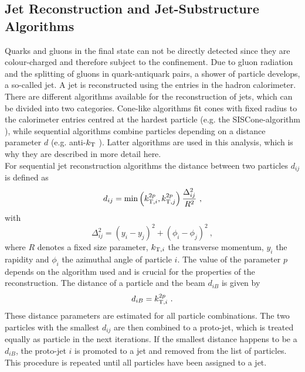 \subsection{Jet Reconstruction and Jet-Substructure Algorithms}
\label{sec:jetreco}
Quarks and gluons in the final state can not be directly detected since they are colour-charged and therefore subject to the confinement. Due to gluon radiation and the splitting of gluons in quark-antiquark pairs, a shower of particle develops, a so-called jet. A jet is reconstructed using the entries in the hadron calorimeter. There are different algorithms available for the reconstruction of jets, which can be divided into two categories. Cone-like algorithms fit cones with fixed radius to the calorimeter entries centred at the hardest particle (e.g. the SISCone-algorithm \cite{siscone}), while sequential algorithms combine particles depending on a distance parameter $d$ (e.g. anti-$k_{\rm T}$ \cite{antikt}). Latter algorithms are used in this analysis, which is why they are described in more detail here.\\

\noindent For sequential jet reconstruction algorithms the distance between two particles $d_{ij}$ is defined as
\begin{align}
d_{ij} = \min\left(k_{{\rm T},i}^{2p},k_{{\rm T},j}^{2p}\right)\frac{\Delta_{ij}^2}{R^2} ~,
\end{align}
with
\begin{equation}
\Delta_{ij}^2 = (y_i-y_j)^2 + (\phi_i - \phi_j)^2 ~, \label{eq:reco:deltar}
\end{equation}
where $R$ denotes a fixed size parameter, $k_{{\rm T},i}$ the transverse momentum, $y_i$ the rapidity and $\phi_i$ the azimuthal angle of particle $i$. The value of the parameter $p$ depends on the algorithm used and is crucial for the properties of the reconstruction. The distance of a particle and the beam $d_{iB}$ is given by
\begin{equation}
d_{iB} = k_{{\rm T},i}^{2p} ~.
\end{equation}
These distance parameters are estimated for all particle combinations. The two particles with the smallest $d_{ij}$ are then combined to a proto-jet, which is treated equally as particle in the next iterations. If the smallest distance happens to be a $d_{iB}$, the proto-jet $i$ is promoted to a jet and removed from the list of particles. This procedure is repeated until all particles have been assigned to a jet.\\

